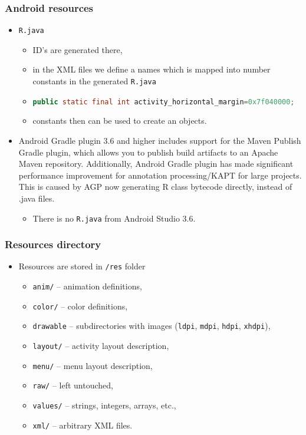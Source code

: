 \documentclass[10pt,xcolor=pdflatex]{beamer}
\newcommand{\inlinejava}{\lstinline[language={Java},basicstyle=\ttfamily,keepspaces]}
\newcommand{\radkovani}[1]{\renewcommand{\baselinestretch}{#1}}
\begin{document}
\begin{frame}\frametitle{Android resources}
	\begin{itemize}
		\item \texttt{R.java}
          \begin{itemize}
            \item ID's are generated there,
            \item in the XML files we define a names which is mapped into number constants in the generated \texttt{R.java}
            \item[] {\footnotesize \inlinejava{public static final int activity_horizontal_margin=0x7f040000;}}
        	\item constants then can be used to create an objects.
          \end{itemize}
        \item Android Gradle plugin 3.6 and higher includes support for the Maven Publish Gradle plugin, which allows you to publish build artifacts to an Apache Maven repository. Additionally, Android Gradle plugin has made significant performance improvement for annotation processing/KAPT for large projects. This is caused by AGP now generating R class bytecode directly, instead of .java files.
          \begin{itemize}
            \item There is no \texttt{R.java} from Android Studio 3.6.
          \end{itemize}
	\end{itemize}
\end{frame}

\begin{frame}[fragile]\frametitle{Resources directory}
	\def\itm[#1]{\item\texttt{#1} -- }
	\begin{itemize}
		\item Resources are stored in \texttt{/res} folder
        \radkovani{1.2}
          \begin{itemize}
        	\itm[anim/]animation definitions,
        	\itm[color/]color definitions,
        	\itm[drawable] subdirectories with images (\texttt{ldpi}, \texttt{mdpi}, \texttt{hdpi}, \texttt{xhdpi}),
        	\itm[layout/]activity layout description,
        	\itm[menu/]menu layout description,
        	\itm[raw/]left untouched,
        	\itm[values/]strings, integers, arrays, etc.,
        	\itm[xml/]arbitrary XML files.
          \end{itemize}
		\radkovani{1}
	\end{itemize}
\end{frame}
\end{document}
